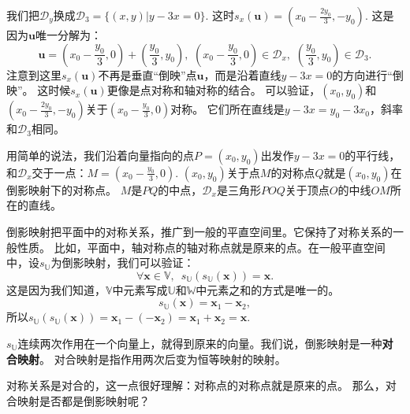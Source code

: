 \documentclass[12pt,UTF8]{ctexbook}
\begin{document}
我们把$\mathcal{D}_y$换成$\mathcal{D}_{3} = \{(x, y) | y - 3x = 0\}.$
这时$s_x(\mathbf{u}) = (x_0-\frac{2y_0}{3},-y_0)$.
这是因为$\mathbf{u}$唯一分解为：
$$\mathbf{u} = (x_0-\frac{y_0}{3},0) + (\frac{y_0}{3},y_0), \,\,(x_0-\frac{y_0}{3},0)\in\mathcal{D}_x,\,\,(\frac{y_0}{3},y_0)\in\mathcal{D}_3.$$
注意到这里$s_x(\mathbf{u})$不再是垂直“倒映”点$\mathbf{u}$，而是沿着直线$y - 3x = 0$的方向进行“倒映”。
这时候$s_x(\mathbf{u})$更像是点对称和轴对称的结合。
可以验证，$(x_0,y_0)$和$(x_0-\frac{2y_0}{3},-y_0)$关于$(x_0-\frac{y_0}{3},0)$对称。
它们所在直线是$y - 3x = y_0 - 3x_0$，斜率和$\mathcal{D}_{3}$相同。

用简单的说法，我们沿着向量指向的点$P = (x_0, y_0)$出发作$y - 3x = 0$的平行线，
和$\mathcal{D}_x$交于一点：$M = (x_0-\frac{y_0}{3},0).$
$(x_0, y_0)$关于点$M$的对称点$Q$就是$(x_0, y_0)$在倒影映射下的对称点。
$M$是$PQ$的中点，$\mathcal{D}_x$是三角形$POQ$关于顶点$O$的中线$OM$所在的直线。

倒影映射把平面中的对称关系，推广到一般的平直空间里。它保持了对称关系的一般性质。
比如，平面中，轴对称点的轴对称点就是原来的点。在一般平直空间中，设$s_{\mathbb{U}}$为倒影映射，我们可以验证：
$$ \forall \mathbf{x} \in \mathbb{V},\,\,\,s_{\mathbb{U}}(s_{\mathbb{U}}(\mathbf{x})) = \mathbf{x}.$$
这是因为我们知道，$\mathbb{V}$中元素写成$\mathbb{U}$和$\mathbb{W}$中元素之和的方式是唯一的。
$$s_{\mathbb{U}}(\mathbf{x}) = \mathbf{x}_1 - \mathbf{x}_2,$$
所以$s_{\mathbb{U}}(s_{\mathbb{U}}(\mathbf{x})) = \mathbf{x}_1 - (- \mathbf{x}_2) =  \mathbf{x}_1 + \mathbf{x}_2 = \mathbf{x}.$

$s_{\mathbb{U}}$连续两次作用在一个向量上，就得到原来的向量。我们说，倒影映射是一种\textbf{对合映射}。
对合映射是指作用两次后变为恒等映射的映射。

对称关系是对合的，这一点很好理解：对称点的对称点就是原来的点。
那么，对合映射是否都是倒影映射呢？
\end{document}
